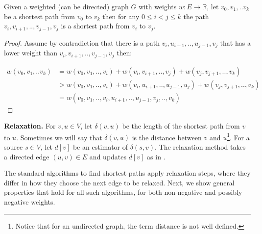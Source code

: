 \begin{claim}
  \label{claim:subpath}
  Given a weighted (can be directed) graph $G$ with weights $w : E \rightarrow \mathbb{R}$, let $ v_{0},v_{1},..v_{k}$ be a shortest path from $v_{0}$ to $v_{k}$ then for any $0\le i<j \le k$ the path $v_{i},v_{i+1},..,v_{j-1},v_{j}$ is a shortest path from $v_{i}$ to $v_{j}$.
\end{claim}
\begin{proof}
  Assume by contradiction that there is a path $v_{i}, u_{i+1}, .., u_{j-1}, v_{j}$ that has a lower weight than $v_{i},v_{i+1},..,v_{j-1},v_{j}$ then: 
  
  \begin{equation*}
    \begin{split}
      w\left(     v_{0},v_{1},..v_{k} \right) &=w\left( v_{0},v_{1},..,v_{i}  \right) + w\left( v_{i},v_{i+1},..,v_{j} \right) + w\left( v_{j},v_{j+1},..,v_{k} \right) \\
      & > w\left( v_{0},v_{1},..,v_{i}  \right) + w\left( v_{i},u_{i+1},..,u_{j-1}, u_{j} \right) + w\left( v_{j},v_{j+1},..,v_{k} \right) \\
      & = w\left(     v_{0},v_{1},..,v_{i},u_{i+1},..,u_{j-1},v_{j}, .., v_{k} \right) 
    \end{split}
  \end{equation*}
\end{proof}

\textbf{Relaxation.} For $v, u \in V$, let $\delta(v, u)$ be the length of the shortest path from $v$ to $u$. Sometimes we will say that $\delta(v, u)$ is the distance between $v$ and $u$\footnote{Notice that for an undirected graph, the term distance is not well defined.}. For a source $s \in V$, let $d[v]$ be an estimator of $\delta(s, v)$. The relaxation method takes a directed edge $(u, v) \in E$ and updates $d[v]$ as in . 

  \begin{algorithm}[h]
    \caption{Relaxation.}
    \label{alg:relax}
  \end{algorithm} 

The standard algorithms to find shortest paths apply relaxation steps, where they differ in how they choose the next edge to be relaxed. Next, we show general properties that hold for all such algorithms, for both non-negative and possibly negative weights.

